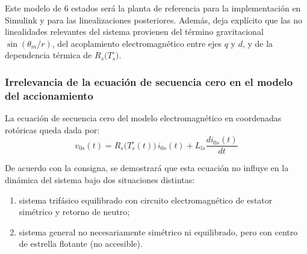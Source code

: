 \documentclass[12pt, a4paper,journal, onecolumn, compsoc]{IEEEtran}
\begin{document}
    Este modelo de 6 estados será la planta de referencia para la implementación en Simulink y para las linealizaciones posteriores. Además, deja explícito que las no linealidades relevantes del sistema provienen del término gravitacional \(\sin(\theta_m/r)\), del acoplamiento electromagnético entre ejes \(q\) y \(d\), y de la dependencia térmica de \(R_s\big(T_s^\circ\big)\).


    \subsubsection{Irrelevancia de la ecuación de secuencia cero en el modelo del accionamiento}

    La ecuación de secuencia cero del modelo electromagnético en coordenadas rotóricas queda dada por:
    \begin{equation}
        v_{0s}(t)=R_s\!\big(T_s^\circ(t)\big)\,i_{0s}(t)+L_{ls}\frac{d i_{0s}(t)}{dt}
        \label{eq:v0s_rotor_final}
    \end{equation}

    De acuerdo con la consigna, se demostrará que esta ecuación no influye en la dinámica del sistema bajo dos situaciones distintas:

    \begin{enumerate}
        \item sistema trifásico equilibrado con circuito electromagnético de estator simétrico y retorno de neutro;
        \item sistema general no necesariamente simétrico ni equilibrado, pero con centro de estrella flotante (no accesible).
    \end{enumerate}
\end{document}
